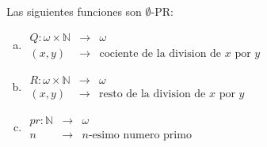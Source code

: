   \begin{lemma}
    \PN Las siguientes funciones son $\emptyset$-PR:

    \begin{enumerate}[a)]
      \item
        $\begin{array}{rll}
          Q: \omega \times \mathbb{N} &\rightarrow& \omega \\
          (x,y) & \rightarrow & \text{cociente de la division de } x \text{ por } y
        \end{array}$
      \item
        $\begin{array}{rll}
          R: \omega \times \mathbb{N} &\rightarrow& \omega \\
          (x,y) &\rightarrow& \text{resto de la division de } x \text{ por } y
        \end{array}$
      \item
        $\begin{array}{rll}
          pr: \mathbb{N} &\rightarrow& \omega \\
          n & \rightarrow & n\text{-esimo numero primo}
        \end{array}$
    \end{enumerate}
  \end{lemma}
